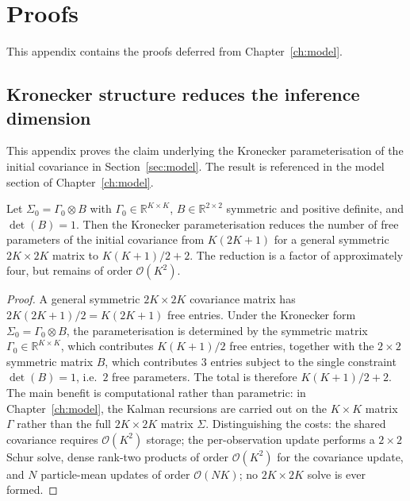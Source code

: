 \chapter{Proofs}
\label{app:proofs}

This appendix contains the proofs deferred from Chapter~\ref{ch:model}.

\section{Kronecker structure reduces the inference dimension}
\label{app:kronecker-proof}

This appendix proves the claim underlying the Kronecker parameterisation of the initial covariance in Section~\ref{sec:model}. The result is referenced in the model section of Chapter~\ref{ch:model}.

\begin{proposition}
\label{prop:kronecker-dim}
Let $\Sigma_0 = \Gamma_0 \otimes B$ with $\Gamma_0 \in \mathbb{R}^{K \times K}$, $B \in \mathbb{R}^{2 \times 2}$ symmetric and positive definite, and $\det(B) = 1$. Then the Kronecker parameterisation reduces the number of free parameters of the initial covariance from $K(2K+1)$ for a general symmetric $2K \times 2K$ matrix to $K(K+1)/2 + 2$. The reduction is a factor of approximately four, but remains of order $\mathcal{O}(K^2)$.
\end{proposition}

\begin{proof}
A general symmetric $2K \times 2K$ covariance matrix has $2K(2K+1)/2 = K(2K+1)$ free entries. Under the Kronecker form $\Sigma_0 = \Gamma_0 \otimes B$, the parameterisation is determined by the symmetric matrix $\Gamma_0 \in \mathbb{R}^{K \times K}$, which contributes $K(K+1)/2$ free entries, together with the $2 \times 2$ symmetric matrix $B$, which contributes $3$ entries subject to the single constraint $\det(B) = 1$, i.e.\ $2$ free parameters. The total is therefore $K(K+1)/2 + 2$. The main benefit is computational rather than parametric: in Chapter~\ref{ch:model}, the Kalman recursions are carried out on the $K \times K$ matrix $\Gamma$ rather than the full $2K \times 2K$ matrix $\Sigma$. Distinguishing the costs: the shared covariance requires $\mathcal{O}(K^2)$ storage; the per-observation update performs a $2 \times 2$ Schur solve, dense rank-two products of order $\mathcal{O}(K^2)$ for the covariance update, and $N$ particle-mean updates of order $\mathcal{O}(NK)$; no $2K \times 2K$ solve is ever formed.
\end{proof}

